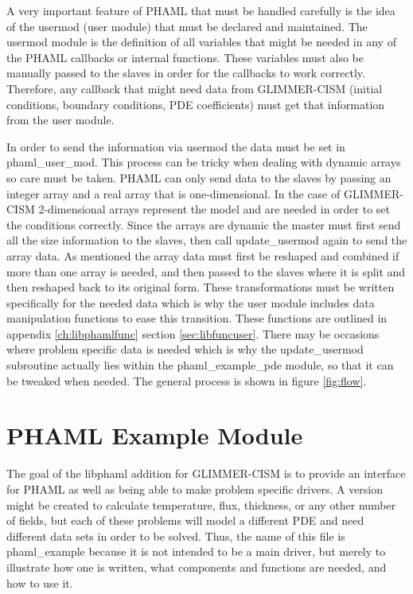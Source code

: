 A very important feature of PHAML that must be handled carefully is the idea of the usermod (user module) that must be declared and maintained.  The usermod module is the definition of all variables that might be needed in any of the PHAML callbacks or internal functions.  These variables must also be manually passed to the slaves in order for the callbacks to work correctly.  Therefore, any callback that might need data from GLIMMER-CISM (initial conditions, boundary conditions, PDE coefficients) must get that information from the user module.  

In order to send the information via usermod the data must be set in phaml\_user\_mod.  This process can be tricky when dealing with dynamic arrays so care must be taken.  PHAML can only send data to the slaves by passing an integer array and a real array that is one-dimensional.  In the case of GLIMMER-CISM 2-dimensional arrays represent the model and are needed in order to set the conditions correctly.  Since the arrays are dynamic the master must first send all the size information to the slaves, then call update\_usermod again to send the array data.  As mentioned the array data must first be reshaped and combined if more than one array is needed, and then passed to the slaves where it is split and then reshaped back to its original form.  These transformations must be written specifically for the needed data which is why the user module includes data manipulation functions to ease this transition.  These functions are outlined in appendix \ref{ch:libphamlfunc} section \ref{sec:libfuncuser}.  There may be occasions where problem specific data is needed which is why the update\_usermod subroutine actually lies within the phaml\_example\_pde module, so that it can be tweaked when needed.  The general process is shown in figure \ref{fig:flow}.


  

\section{PHAML Example Module}\label{sec:ch4example}

The goal of the libphaml addition for GLIMMER-CISM is to provide an interface for PHAML as well as being able to make problem specific drivers.  A version might be created to calculate temperature, flux, thickness, or any other number of fields, but each of these problems will model a different PDE and need different data sets in order to be solved.  Thus, the name of this file is phaml\_example because it is not intended to be a main driver, but merely to illustrate how one is written, what components and functions are needed, and how to use it.


